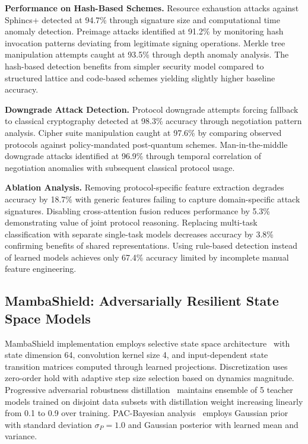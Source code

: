 \textbf{Performance on Hash-Based Schemes.} Resource exhaustion attacks against Sphincs+ detected at 94.7\% through signature size and computational time anomaly detection. Preimage attacks identified at 91.2\% by monitoring hash invocation patterns deviating from legitimate signing operations. Merkle tree manipulation attempts caught at 93.5\% through depth anomaly analysis. The hash-based detection benefits from simpler security model compared to structured lattice and code-based schemes yielding slightly higher baseline accuracy.

\textbf{Downgrade Attack Detection.} Protocol downgrade attempts forcing fallback to classical cryptography detected at 98.3\% accuracy through negotiation pattern analysis. Cipher suite manipulation caught at 97.6\% by comparing observed protocols against policy-mandated post-quantum schemes. Man-in-the-middle downgrade attacks identified at 96.9\% through temporal correlation of negotiation anomalies with subsequent classical protocol usage.

\textbf{Ablation Analysis.} Removing protocol-specific feature extraction degrades accuracy by 18.7\% with generic features failing to capture domain-specific attack signatures. Disabling cross-attention fusion reduces performance by 5.3\% demonstrating value of joint protocol reasoning. Replacing multi-task classification with separate single-task models decreases accuracy by 3.8\% confirming benefits of shared representations. Using rule-based detection instead of learned models achieves only 67.4\% accuracy limited by incomplete manual feature engineering.

\subsection{MambaShield: Adversarially Resilient State Space Models}

MambaShield implementation employs selective state space architecture~\cite{gu2024mamba} with state dimension 64, convolution kernel size 4, and input-dependent state transition matrices computed through learned projections. Discretization uses zero-order hold with adaptive step size selection based on dynamics magnitude. Progressive adversarial robustness distillation~\cite{papernot2016distillation} maintains ensemble of 5 teacher models trained on disjoint data subsets with distillation weight increasing linearly from 0.1 to 0.9 over training. PAC-Bayesian analysis~\cite{mcallester2003pac,dziugaite2017computing} employs Gaussian prior with standard deviation $\sigma_P = 1.0$ and Gaussian posterior with learned mean and variance.

